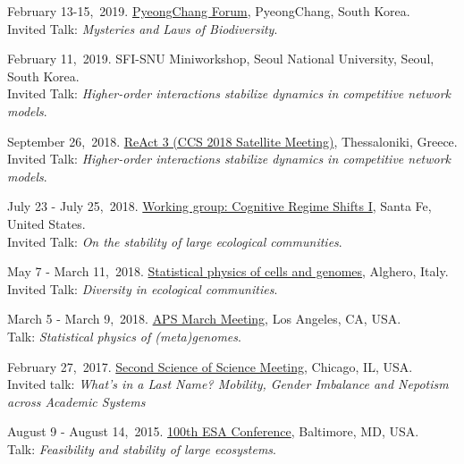 \documentclass[10pt]{article}
\begin{document}
\begin{outerlist}
    \item February 13-15,~2019.
	 \href{http://pyeongchangfr.com/eng/}{PyeongChang Forum}, PyeongChang, South Korea.\\
	Invited Talk: 
	\emph{Mysteries and Laws of Biodiversity}. %


    \item February 11,~2019.
	 SFI-SNU Miniworkshop, Seoul National University, Seoul, South Korea.\\
	Invited Talk: 
	\emph{Higher-order interactions stabilize dynamics in competitive network models}. %

    \item September 26,~2018.
	 \href{https://easychair.org/cfp/ReACT3}{ReAct 3 (CCS 2018 Satellite Meeting)}, Thessaloniki, Greece.\\
	Invited Talk: 
	\emph{Higher-order interactions stabilize dynamics in competitive network models}. %

    \item July 23 - July 25,~2018.
	 \href{https://www.santafe.edu/events/cognitive-regime-shift-i-when-brain-breaks}{Working group: Cognitive Regime Shifts I}, Santa Fe, United States.\\
	Invited Talk: 
	\emph{On the stability of large ecological communities}. %


    \item May 7 - March 11,~2018.
	 \href{http://www.portocontericerche.it/en/news/statistical-physics-cells-and-genomes}{Statistical physics of cells and genomes}, Alghero, Italy.\\
	Invited Talk: 
	\emph{ Diversity in ecological communities}. %

    \item March 5 - March 9,~2018.
	 \href{http://meetings.aps.org/Meeting/MAR18/Session/K51.11}{APS March Meeting}, Los Angeles, CA, USA.\\
	Talk: 
	\emph{ Statistical physics of (meta)genomes}. %


    \item February 27,~2017.
	 \href{http://www.science-of-science-chicago.org/}{Second Science of Science Meeting}, Chicago, IL, USA.\\
	Invited talk: 
	\emph{What's in a Last Name? Mobility, Gender Imbalance and Nepotism across Academic Systems} %



    \item August 9 - August 14,~2015.
	 \href{http://esa.org/baltimore/}{100th ESA Conference}, Baltimore, MD, USA.\\
	Talk: 
	\emph{Feasibility and stability of large ecosystems}. %
	


\end{outerlist}
\end{document}
